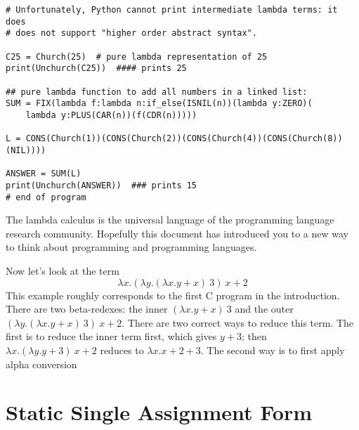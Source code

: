 \begin{verbatim}
# Unfortunately, Python cannot print intermediate lambda terms: it does
# does not support "higher order abstract syntax".

C25 = Church(25)  # pure lambda representation of 25
print(Unchurch(C25))  #### prints 25

## pure lambda function to add all numbers in a linked list:
SUM = FIX(lambda f:lambda n:if_else(ISNIL(n))(lambda y:ZERO)(
    lambda y:PLUS(CAR(n))(f(CDR(n)))))

L = CONS(Church(1))(CONS(Church(2))(CONS(Church(4))(CONS(Church(8))(NIL))))

ANSWER = SUM(L)
print(Unchurch(ANSWER))  ### prints 15
# end of program
\end{verbatim}





\medskip

The lambda calculus is the universal language of the programming language
research community. Hopefully this document has introduced you to a new way
to think about programming and programming languages.  


Now let's look at the term
$$ \lambda x.(\lambda y.(\lambda x.y+x)~3)~x+2$$
This example roughly corresponds to the first C program in the introduction.
There are two beta-redexes: the inner $(\lambda x.y+x)~3$ and the outer
$(\lambda y.(\lambda x.y+x)~3)~x+2$.  There are two correct ways to reduce
this term.  The first is to reduce the inner term first, which gives
$y+3$; then $\lambda x.(\lambda y.y+3)~x+2$ reduces to
$\lambda x.x+2+3$.  The second way is to first apply alpha conversion



\section{Static Single Assignment Form}

